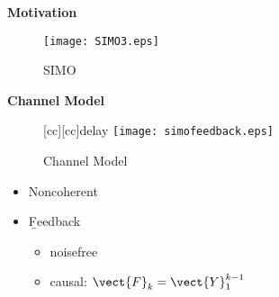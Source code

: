 \documentclass[landscape,dvips,a4]{seminar}
\begin{document}
\begin{slide}
  \begin{center}
    \textbf{\Large Motivation}
  \end{center}
 \vspace{3mm}
\begin{figure}[htbp]
   \centering
   \texttt{[image: SIMO3.eps]}
   \caption{SIMO}
   \label{fig:SIMO}
 \end{figure}

\end{slide}



\begin{slide}
  \begin{center}
    \textbf{\Large Channel Model}
  \end{center}
 \vspace{3mm}
\begin{figure*}[t]
\centering
{}
[cc][cc]{delay}
\texttt{[image: simofeedback.eps]}
\caption{Channel Model}
\label{fig:simofeedback}
\end{figure*}

   \begin{itemize}
   \item Noncoherent
   \item {\b{Feedback}}
     \begin{itemize}
  \item noisefree
       \item causal: $\vect{F}_k=\vect{Y}_1^{k-1}$
     \end{itemize}
   \end{itemize}
\end{slide}
\end{document}
